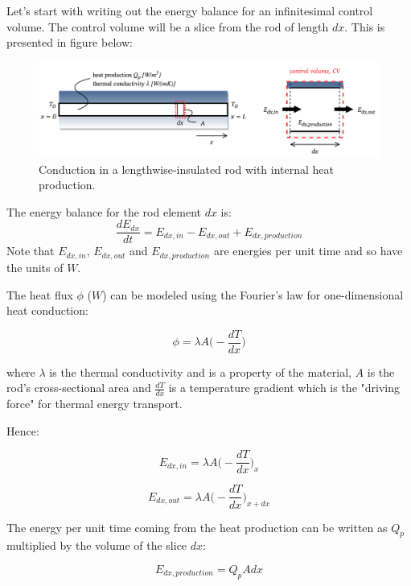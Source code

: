\documentclass[10pt]{article}
\begin{document}
Let's start with writing out the energy balance for an infinitesimal control volume. The control volume will be a slice from the rod of length $dx$. This is presented in figure below:
\begin{figure}[H]
\centering\includegraphics[width=16cm]{plots/cond-rod.png}
\caption{Conduction in a lengthwise-insulated rod with internal heat production.}
\label{fig:conduction}
\end{figure}
The energy balance for the rod element $dx$ is:
\begin{equation}
\frac{dE_{dx}}{dt} = E_{dx, in} - E_{dx, out} + E_{dx, production}
\end{equation}
Note that $E_{dx, in}$, $E_{dx, out}$ and $E_{dx, production}$ are energies per unit time and so have the units of $W$.

The heat flux $\phi$ ($W$) can be modeled using the Fourier's law for one-dimensional heat conduction:

\begin{equation}
\phi = \lambda A \Big(- \frac{dT}{dx} \Big)
\label{eq:fourier}
\end{equation}

where $\lambda$ is the thermal conductivity and is a property of the material, $A$ is the rod's cross-sectional area and $\frac{dT}{dx}$ is a temperature gradient which is the "driving force" for thermal energy transport.

Hence:

\begin{equation}
E_{dx, in} = \lambda A \Big(- \frac{dT}{dx} \Big)_x
\end{equation}

\begin{equation}
E_{dx, out} = \lambda A \Big(- \frac{dT}{dx} \Big)_{x + dx}
\end{equation}

The energy per unit time coming from the heat production can be written as $Q_p$ multiplied by the volume of the slice $dx$:

\begin{equation}
E_{dx, production} = Q_p A dx
\end{equation}
\end{document}
